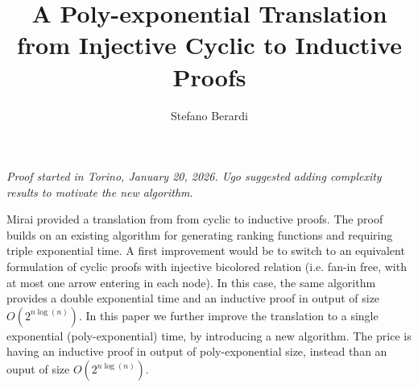 \documentclass{lmcs}
\begin{document}
\sloppy 
{}


\newcommand{\size} 		                  {{\tt s}}
\newcommand{\state} 		               {{\tt S}}
\newcommand{\minStable}             {{\tt m}}
\newcommand{\unfold}                   {{\tt u}}
\newcommand{\height}                    {{\tt h}}
\newcommand{\setF} 		                   {{\mathcal F}}
\newcommand{\setU} 	                   {{\mathcal U}}
\newcommand{\cons}                       {{\tt cons}}
\newcommand{\newton} [2]             {{\genfrac(){0pt}{1} {#1}{#2}}}
\newcommand{\questionMarks} [1] {{‘‘#1’’}}
\newcommand{\DomCard}               {{\tt DomCard}}
\newcommand{\MaxInd}                  {{\tt M}}
\newcommand{\DomIncr}                {{\tt DomIncr}}
\newcommand{\trans}                       {{\tt trans}}

\title{A Poly-exponential Translation from Injective Cyclic to Inductive Proofs}
\date{}

\author[S. Berardi]{Stefano Berardi}
\address{Universit\`{a} di Torino,
Torino, Italy}




\maketitle


\emph{Proof started in Torino, January 20, 2026. 
Ugo suggested adding complexity results to motivate the new algorithm}.

Mirai \cite{} provided a translation from from cyclic to inductive proofs. The proof builds
on an existing algorithm for generating ranking functions and 
requiring triple exponential time. A first improvement would be to switch to an equivalent
formulation of cyclic proofs with injective bicolored relation (i.e. fan-in free, with at most one
arrow entering in each node). In this case, the same algorithm provides a double exponential
time \cite{} and an inductive proof in output of size $O(2^{n \log(n)})$.
In this paper we further improve the translation to a single exponential (poly-exponential) time, 
by introducing a new algorithm. The price is having an inductive proof in output
of poly-exponential size, instead than an ouput of size $O(2^{n \log(n)})$.
\end{document}
